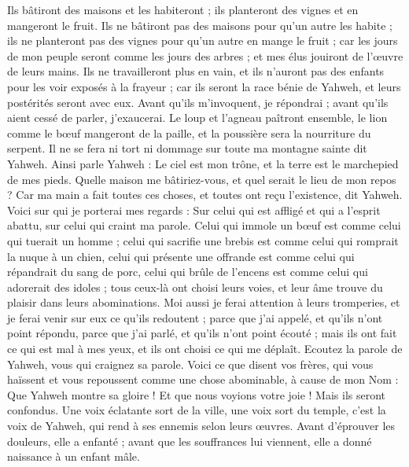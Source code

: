 \begin{multicols}{2}
Ils bâtiront des maisons et les habiteront ; ils planteront des vignes et en mangeront le fruit.
Ils ne bâtiront pas des maisons pour qu'un autre les habite ; ils ne planteront pas des vignes pour qu'un autre en mange le fruit ; car les jours de mon peuple seront comme les jours des arbres ; et mes élus jouiront de l'œuvre de leurs mains.
Ils ne travailleront plus en vain, et ils n'auront pas des enfants pour les voir exposés à la frayeur ; car ils seront la race bénie de Yahweh, et leurs postérités seront avec eux.
Avant qu'ils m'invoquent, je répondrai ; avant qu'ils aient cessé de parler, j'exaucerai.
Le loup et l'agneau paîtront ensemble, le lion comme le bœuf mangeront de la paille, et la poussière sera la nourriture du serpent. Il ne se fera ni tort ni dommage sur toute ma montagne sainte dit Yahweh.
\VerseOne{}Ainsi parle Yahweh : Le ciel est mon trône, et la terre est le marchepied de mes pieds. Quelle maison me bâtiriez-vous, et quel serait le lieu de mon repos ?
Car ma main a fait toutes ces choses, et toutes ont reçu l'existence, dit Yahweh. Voici sur qui je porterai mes regards : Sur celui qui est affligé et qui a l'esprit abattu, sur celui qui craint ma parole.
Celui qui immole un bœuf est comme celui qui tuerait un homme ; celui qui sacrifie une brebis est comme celui qui romprait la nuque à un chien, celui qui présente une offrande est comme celui qui répandrait du sang de porc, celui qui brûle de l'encens est comme celui qui adorerait des idoles ; tous ceux-là ont choisi leurs voies, et leur âme trouve du plaisir dans leurs abominations.
Moi aussi je ferai attention à leurs tromperies, et je ferai venir sur eux ce qu'ils redoutent ; parce que j'ai appelé, et qu'ils n'ont point répondu, parce que j'ai parlé, et qu'ils n'ont point écouté ; mais ils ont fait ce qui est mal à mes yeux, et ils ont choisi ce qui me déplaît.
Ecoutez la parole de Yahweh, vous qui craignez sa parole. Voici ce que disent vos frères, qui vous haïssent et vous repoussent comme une chose abominable, à cause de mon Nom : Que Yahweh montre sa gloire ! Et que nous voyions votre joie ! Mais ils seront confondus.
Une voix éclatante sort de la ville, une voix sort du temple, c'est la voix de Yahweh, qui rend à ses ennemis selon leurs œuvres.
Avant d'éprouver les douleurs, elle a enfanté ; avant que les souffrances lui viennent, elle a donné naissance à un enfant mâle.

\end{multicols}
